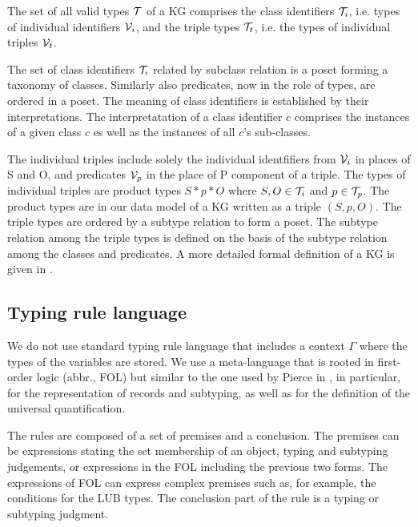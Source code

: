 \documentclass[runningheads]{llncs}
\newcommand{\V}{{\cal V}}
\newcommand{\T}{{\cal T}}
\newcommand{\memo}[1]{}
\begin{document}
The set of all valid types $\T$ of a KG comprises the class
identifiers $\T_i$, i.e. types of individual identifiers $\V_i$, and
the triple types $\T_t$, i.e. the types of individual triples $\V_t$.

The set of class identifiers $\T_i$ related by subclass relation is a
poset forming a taxonomy of classes. Similarly also predicates, now
in the role of types, are ordered in a poset. The meaning of class
identifiers is established by their interpretations. The
interpretatation of a class identifier $c$ comprises the instances of
a given class $c$ es well as the instances of all $c$'s sub-classes. 

The individual triples include solely the individual identfifiers from
$\V_i$ in places of S and O, and predicates $\V_p$ in the place of P
component of a triple. The types of individual triples are product
types $S*p*O$ where $S,O\in\T_i$ and $p\in\T_p$. The product types are
in our data model of a KG written as a triple $(S,p,O)$. The triple
types are ordered by a subtype relation to form a poset. The subtype
relation among the triple types is defined on the basis of the subtype
relation among the classes and predicates. A more detailed formal
definition of a KG is given in \cite{Savnik2025}.





\subsection{Typing rule language}

\memo{
In this paper we define typing of a data language used to represent an
ABOX \cite{Brachman2004KnowledgeRR} of a knowledge base given in a
form of a knowledge graph. The data language specifys the assertions
in the form of ground triples (ABOX) and the schema of assertions as
the types of triples (TBOX). The ground triples are the instances of
the triple types that altogether define the schema of a KG.}

We do not use standard typing rule language
\cite{Pierce2002,Hindley1997} that includes a context $\Gamma$ where
the types of the variables are stored. We use a meta-language that is
rooted in first-order logic (abbr., FOL) but similar to the one used
by Pierce in \cite{Pierce2002}, in particular, for the representation
of records and subtyping, as well as for the definition of the
universal quantification.

The rules are composed of a set of premises and a conclusion. The
premises can be expressions stating the set membership of an object,
typing and subtyping judgements, or expressions in the FOL including
the previous two forms. The expressions of FOL can express complex
premises such as, for example, the conditions for the LUB types. The
conclusion part of the rule is a typing or subtyping judgment.
\end{document}
